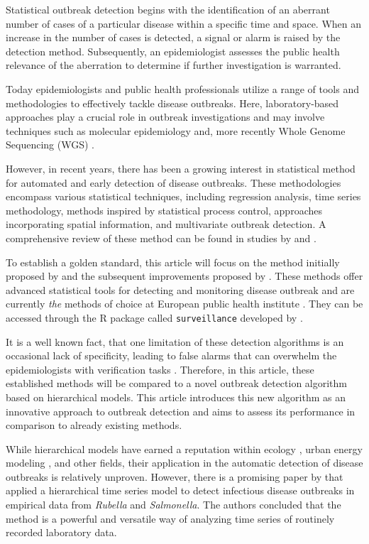 \documentclass[preprint, 3p,
authoryear]{elsarticle} %
\begin{document}
Statistical outbreak detection begins with the identification of an
aberrant number of cases of a particular disease within a specific time
and space. When an increase in the number of cases is detected, a signal
or alarm is raised by the detection method. Subsequently, an
epidemiologist assesses the public health relevance of the aberration to
determine if further investigation is warranted.

Today epidemiologists and public health professionals utilize a range of
tools and methodologies to effectively tackle disease outbreaks. Here,
laboratory-based approaches play a crucial role in outbreak
investigations and may involve techniques such as molecular epidemiology
\citep[\citet{Struelens_2013}]{Honardoost_2018} and, more recently Whole
Genome Sequencing (WGS) \citep[\citet{Baldry_2010}]{Koeser_2012}.

However, in recent years, there has been a growing interest in
statistical method for automated and early detection of disease
outbreaks. These methodologies encompass various statistical techniques,
including regression analysis, time series methodology, methods inspired
by statistical process control, approaches incorporating spatial
information, and multivariate outbreak detection. A comprehensive review
of these method can be found in studies by \citet{Buckeridge_2007} and
\citet{Unkel_2012}.

To establish a golden standard, this article will focus on the method
initially proposed by \citet{Farrington_1996} and the subsequent
improvements proposed by \citet{Noufaily_2013}. These methods offer
advanced statistical tools for detecting and monitoring disease outbreak
and are currently \emph{the} methods of choice at European public health
institute \citep{Hulth_2010}. They can be accessed through the R package
called \texttt{surveillance} developed by \citet{Salmon_2016}.

It is a well known fact, that one limitation of these detection
algorithms is an occasional lack of specificity, leading to false alarms
that can overwhelm the epidemiologists with verification tasks
\citep{Bedubourg_2017}. Therefore, in this article, these established
methods will be compared to a novel outbreak detection algorithm based
on hierarchical models. This article introduces this new algorithm as an
innovative approach to outbreak detection and aims to assess its
performance in comparison to already existing methods.

While hierarchical models have earned a reputation within ecology
\citep[\citet{Zuur_2009}]{Bolker_2009}, urban energy modeling
\citep[\citet{Jaume_2022}]{Real_2021}, and other fields, their
application in the automatic detection of disease outbreaks is
relatively unproven. However, there is a promising paper by
\citet{Heisterkamp_2006} that applied a hierarchical time series model
to detect infectious disease outbreaks in empirical data from
\emph{Rubella} and \emph{Salmonella}. The authors concluded that the
method is a powerful and versatile way of analyzing time series of
routinely recorded laboratory data.
\end{document}
